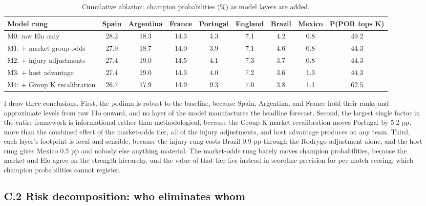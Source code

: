 \documentclass[11pt,letterpaper]{article}
\begin{document}
\begin{table}[ht]
\centering\small
\caption{Cumulative ablation: champion probabilities (\%) as model layers are added.}
\label{tab:ablation}
\begin{tabular}{lcccccccc}
\toprule
Model rung & Spain & Argentina & France & Portugal & England & Brazil & Mexico & P(POR tops K) \\
\midrule
M0: raw Elo only          & 28.2 & 18.3 & 14.3 & 4.3 & 7.1 & 4.2 & 0.8 & 49.2 \\
M1: $+$ market group odds & 27.9 & 18.7 & 14.0 & 3.9 & 7.1 & 4.6 & 0.8 & 44.3 \\
M2: $+$ injury adjustments& 27.4 & 19.0 & 14.5 & 4.1 & 7.3 & 3.7 & 0.8 & 44.3 \\
M3: $+$ host advantage    & 27.4 & 19.0 & 14.3 & 4.0 & 7.2 & 3.6 & 1.3 & 44.3 \\
M4: $+$ Group K recalibration & 26.7 & 17.9 & 14.9 & 9.3 & 7.0 & 3.8 & 1.1 & 62.5 \\
\bottomrule
\end{tabular}
\end{table}

I draw three conclusions. First, the podium is robust to the baseline, because Spain, Argentina, and France hold their ranks and approximate levels from raw Elo onward, and no layer of the model manufactures the headline forecast. Second, the largest single factor in the entire framework is informational rather than methodological, because the Group K market recalibration moves Portugal by 5.2 pp, more than the combined effect of the market-odds tier, all of the injury adjustments, and host advantage produces on any team. Third, each layer's footprint is local and sensible, because the injury rung costs Brazil 0.9 pp through the Rodrygo adjustment alone, and the host rung gives Mexico 0.5 pp and nobody else anything material. The market-odds rung barely moves champion probabilities, because the market and Elo agree on the strength hierarchy, and the value of that tier lies instead in scoreline precision for per-match scoring, which champion probabilities cannot register.

\subsection*{C.2 \quad Risk decomposition: who eliminates whom}
\end{document}
